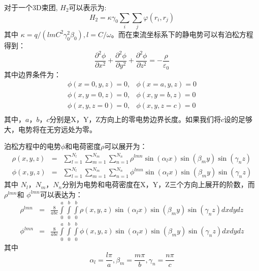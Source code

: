 {对于一个3D束团, ${{H}_{2}}$可以表示为:
\begin{equation}
{{H}_{2}}=\kappa {{\gamma }_{0}}\sum\limits_{i}{\sum\limits_{j}{\varphi ({{r}_{i}},{{r}_{j}})}}
\end{equation}
其中 $\kappa =q/(lm{{C}^{2}}\gamma _{0}^{2}{{\beta }_{0}}),l=C/\omega $。而在束流坐标系下的静电势可以有泊松方程得到：
\begin{equation}
\frac{{{\partial }^{2}}\phi }{\partial {{x}^{2}}}+\frac{{{\partial }^{2}}\phi }{\partial {{y}^{2}}}+\frac{{{\partial }^{2}}\phi }{\partial {{z}^{2}}}=-\frac{\rho }{{{\varepsilon }_{0}}}
\end{equation}
其中边界条件为：
\begin{equation}
\begin{array}{cc}
   \phi (x=0,y,z)=0, & \phi (x=a,y,z)=0  \\
   \phi (x,y=0,z)=0, & \phi (x,y=b,z)=0  \\
   \phi (x,y,z=0)=0, & \phi (x,y,z=c)=0  \\
\end{array}
\end{equation}
其中，$a$，$b$，$c$分别是X，Y，Z方向上的零电势边界长度。如果我们将$c$设的足够大，电势将在无穷远处为零。

泊松方程中的电势$\phi$和电荷密度$\rho$可以展开为：
\begin{eqnarray}
 \rho(x,y,z)&=&\sum\limits_{l=1}^{{{N}_{l}}}{\sum\limits_{m=1}^{{{N}_{m}}}{\sum\limits_{n=1}^{{{N}_{n}}}{{{\rho }^{lmn}}\sin ({{\alpha }_{l}}x)\sin ({{\beta }_{m}}y)\sin ({{\gamma }_{n}}z)}}} \\
 \phi(x,y,z)&=&\sum\limits_{l=1}^{{{N}_{l}}}{\sum\limits_{m=1}^{{{N}_{m}}}{\sum\limits_{n=1}^{{{N}_{n}}}{{{\phi }^{lmn}}\sin ({{\alpha }_{l}}x)\sin ({{\beta }_{m}}y)\sin ({{\gamma }_{n}}z)}}}
\end{eqnarray}
其中 ${N}_{l}$，${N}_{m}$，${N}_{n}$分别为电势和电荷密度在X，Y，Z三个方向上展开的阶数，而 ${\rho }^{lmn}$和 ${\phi }^{lmn}$可以表达为：
\begin{eqnarray}
  {{\rho }^{lmn}}&=&\frac{8}{abc}\int\limits_{0}^{a}{\int\limits_{0}^{b}{\int\limits_{0}^{b}{\rho (x,y,z)\sin ({{\alpha }_{l}}x)\sin ({{\beta }_{m}}y)\sin ({{\gamma }_{n}}z)dxdydz}}} \\
 {{\phi }^{lmn}}&=&\frac{8}{abc}\int\limits_{0}^{a}{\int\limits_{0}^{b}{\int\limits_{0}^{b}{\phi (x,y,z)\sin ({{\alpha }_{l}}x)\sin ({{\beta }_{m}}y)\sin ({{\gamma }_{n}}z)dxdydz}}}
\end{eqnarray}
其中
\begin{equation}
{{\alpha }_{l}}=\frac{l\pi }{a},{{\beta }_{m}}=\frac{m\pi }{b},{{\gamma }_{n}}=\frac{n\pi }{c}
\end{equation}

}
